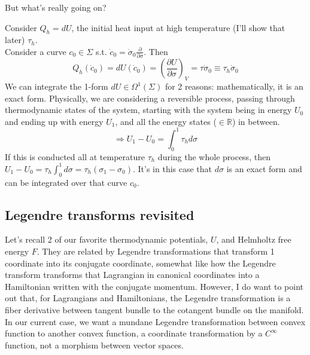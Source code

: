 
But what's really going on? 

Consider $Q_h = dU$, the initial heat input at high temperature (I'll show that later) $\tau_h$.  \\
Consider a curve $c_0 \in \Sigma$ s.t. $\dot{c}_0 = \dot{\sigma}_0 \frac{ \partial }{ \partial \sigma}$.  Then
\[
Q_h(\dot{c}_0) = dU(\dot{c}_0 ) = \left( \frac{ \partial U}{ \partial \sigma} \right)_V = \tau \dot{\sigma}_0 \equiv \tau_h \dot{\sigma}_0
\]
We can integrate the 1-form $dU \in \Omega^1(\Sigma)$ for 2 reasons: mathematically, it is an exact form.  Physically, we are considering a reversible process, passing through thermodynamic states of the system, starting with the system being in energy $U_0$ and ending up with energy $U_1$, and all the energy states ($\in \mathbb{R}$) in between.  
\[
\Longrightarrow U_1 - U_0 = \int_0^1 \tau_h d\sigma
\]
If this is conducted all at temperature $\tau_h$ during the whole process, then $U_1 - U_0 = \tau_h \int_0^1 d\sigma = \tau_h ( \sigma_1 - \sigma_0)$.  It's in this case that $d\sigma$ is an exact form and can be integrated over that curve $c_0$.  

\subsection*{Legendre transforms revisited}

Let's recall 2 of our favorite thermodynamic potentials, $U$, and Helmholtz free energy $F$.  They are related by Legendre transformations that transform 1 coordinate into its conjugate coordinate, somewhat like how the Legendre transform transforms that Lagrangian in canonical coordinates into a Hamiltonian written with the conjugate momentum.  However, I do want to point out that, for Lagrangians and Hamiltonians, the Legendre transformation is a fiber derivative between tangent bundle to the cotangent bundle on the manifold.  In our current case, we want a mundane Legendre transformation between convex function to another convex function, a coordinate transformation by a $C^{\infty}$ function, not a morphism between vector spaces.  

